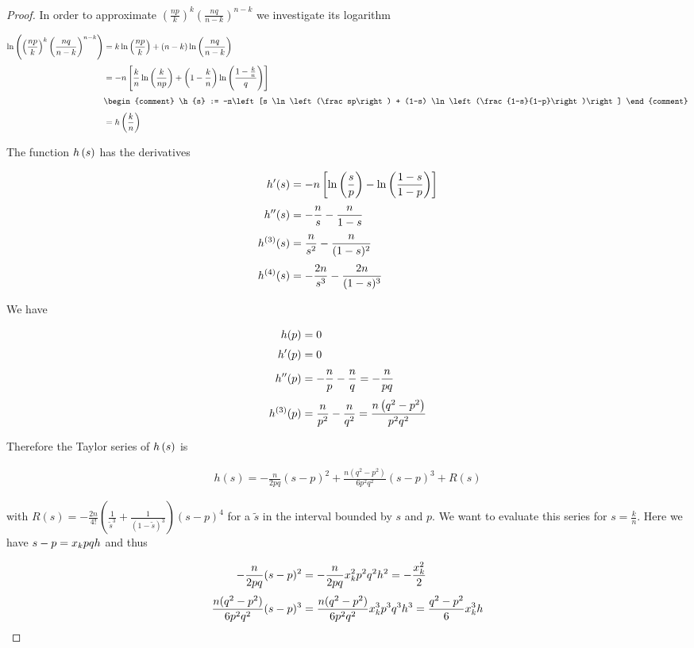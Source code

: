 \begin{proof}
  \noindent In order to approximate $\left(\frac{np}{k}\right)^k \left(\frac{nq}{n-k}\right)^{n-k}$ we investigate its logarithm

  \begin{align}
    \ln\left(\left(\frac{np}{k}\right)^k \left(\frac{nq}{n-k}\right)^{n-k}\right) & = k \ln\left(\frac{np}{k}\right) + (n-k) \ln\left(\frac{nq}{n-k}\right) \nl
    &=-n \left[ \frac kn \ln\left(\frac{k}{np}\right) + \left(1-\frac kn\right) \ln\left(\frac{1-\frac kn}{q}\right)\right] \nl
    &
    \begin{comment}
      \h{s} := -n\left[s \ln\left(\frac sp\right) + (1-s) \ln\left(\frac{1-s}{1-p}\right)\right]
    \end{comment} \nl
    &= \h{\frac kn}
  \end{align}

  \noindent The function $h\left({s}\right)$ has the derivatives

  \begin{align}
    h'(s) &= -n\left[\ln\left(\frac sp\right) - \ln\left(\frac{1-s}{1-p}\right)\right] \nl
    h''(s) &= -\frac ns - \frac n{1-s} \nl
    h^{(3)}(s) &= \frac n{s^2} - \frac n{(1-s)^2} \nl
    h^{(4)}(s) &= -\frac {2n}{s^3} - \frac {2n}{(1-s)^3}
  \end{align}

  \noindent We have

  \begin{align}
    h(p)& = 0 \nl
    h'(p)& =0 \nl
    h''(p) & = -\frac np - \frac nq = -\frac n{pq} \nl
    h^{(3)}(p) &= \frac n{p^2}-\frac{n}{q^2} = \frac{n\left(q^2-p^2\right)}{p^2q^2}
  \end{align}

  \noindent Therefore the Taylor series of $h\left({s}\right)$ is

  \begin{align}
    h(s) = -\frac{n}{2pq} (s-p)^2 + \frac{n(q^2-p^2)}{6p^2q^2} (s-p)^3 + R(s)
  \end{align}

  with $R(s)=-\frac{2n}{4!} \left(\frac{1}{\tilde s^3}+\frac{1}{(1-\tilde s)^3}\right) (s-p)^4$ for a $\tilde s$ in the interval bounded by $s$ and $p$. We want to evaluate this series for $s=\frac kn$. Here we have $s-p=x_{k} pqh$ and thus

  \begin{align}
    -\frac{n}{2pq} (s-p)^2 &= -\frac{n}{2pq} \x^2 p^2 q^2 h^2 = -\frac{\x^2}{2} \nl
    \frac{n(q^2-p^2)}{6p^2q^2} (s-p)^3 &= \frac{n(q^2-p^2)}{6p^2q^2} \x^3p^3q^3h^3 = \frac{q^2-p^2}{6} \x^3 h
  \end{align}


\end{proof}
